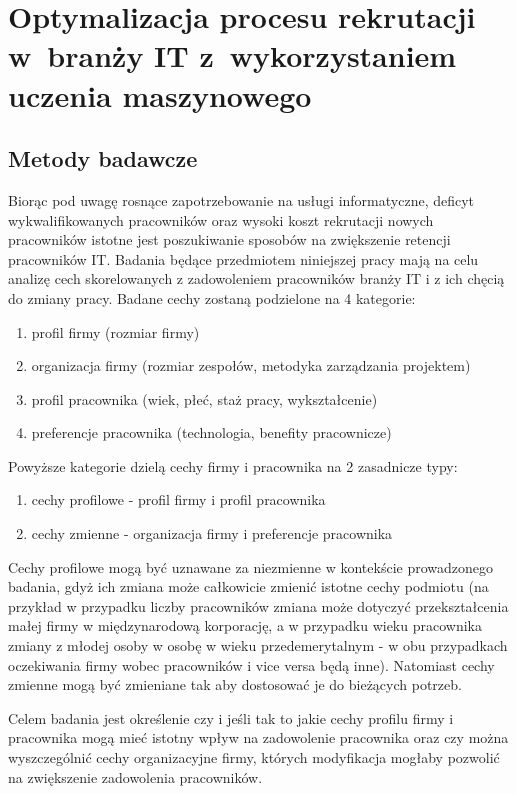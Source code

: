 \chapter{Optymalizacja procesu rekrutacji w~branży IT z~wykorzystaniem uczenia maszynowego}\label{ch:analysis}
\section{Metody badawcze}\label{sec:analysis-method}
Biorąc pod uwagę rosnące zapotrzebowanie na usługi informatyczne, deficyt wykwalifikowanych pracowników \cite{daxx-2021} oraz wysoki koszt rekrutacji nowych pracowników \cite{hairing-dev-2021} istotne jest poszukiwanie sposobów na zwiększenie retencji pracowników IT.
Badania będące przedmiotem niniejszej pracy mają na celu analizę cech skorelowanych z zadowoleniem pracowników branży IT i z ich chęcią do zmiany pracy.
Badane cechy zostaną podzielone na 4 kategorie:
\begin{enumerate}
    \item profil firmy (rozmiar firmy)
    \item organizacja firmy (rozmiar zespołów, metodyka zarządzania projektem)
    \item profil pracownika (wiek, płeć, staż pracy, wykształcenie)
    \item preferencje pracownika (technologia, benefity pracownicze)
    \end{enumerate}

Powyższe kategorie dzielą cechy firmy i pracownika na 2 zasadnicze typy:
\begin{enumerate}
    \item cechy profilowe - profil firmy i profil pracownika
    \item cechy zmienne - organizacja firmy i preferencje pracownika
    \end{enumerate}

Cechy profilowe mogą być uznawane za niezmienne w kontekście prowadzonego badania, gdyż ich zmiana może całkowicie zmienić istotne cechy podmiotu
(na przykład w przypadku liczby pracowników zmiana może dotyczyć przekształcenia małej firmy w międzynarodową korporację, a w przypadku wieku pracownika zmiany z młodej osoby w osobę w wieku przedemerytalnym - w obu przypadkach oczekiwania firmy wobec pracowników i vice versa będą inne).
Natomiast cechy zmienne mogą być zmieniane tak aby dostosować je do bieżących potrzeb.

Celem badania jest określenie czy i jeśli tak to jakie cechy profilu firmy i pracownika mogą mieć istotny wpływ na zadowolenie pracownika
oraz czy można wyszczególnić cechy organizacyjne firmy, których modyfikacja mogłaby pozwolić na zwiększenie zadowolenia pracowników.


